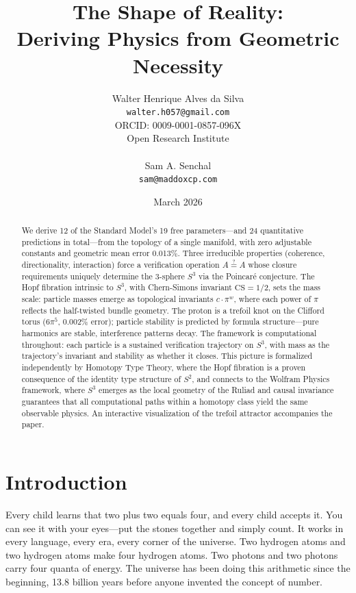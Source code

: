 \documentclass[12pt]{article}
\title{The Shape of Reality: \\
Deriving Physics from Geometric Necessity}
\author{
    Walter Henrique Alves da Silva \\
    \texttt{walter.h057@gmail.com} \\
    ORCID: 0009-0001-0857-096X \\
    Open Research Institute \\
    \\
    Sam A. Senchal \\
    \texttt{sam@maddoxcp.com} \\
}
\date{March 2026}
\begin{document}
\maketitle

\begin{abstract}
We derive 12 of the Standard Model's 19 free parameters---and 24 quantitative predictions in total---from the topology of a single manifold, with zero adjustable constants and geometric mean error 0.013\%. Three irreducible properties (coherence, directionality, interaction) force a verification operation $A \stackrel{?}{=} A$ whose closure requirements uniquely determine the 3-sphere $S^3$ via the Poincar\'e conjecture. The Hopf fibration intrinsic to $S^3$, with Chern-Simons invariant $\mathrm{CS} = 1/2$, sets the mass scale: particle masses emerge as topological invariants $c \cdot \pi^w$, where each power of $\pi$ reflects the half-twisted bundle geometry. The proton is a trefoil knot on the Clifford torus ($6\pi^5$, 0.002\% error); particle stability is predicted by formula structure---pure harmonics are stable, interference patterns decay. The framework is computational throughout: each particle is a sustained verification trajectory on $S^3$, with mass as the trajectory's invariant and stability as whether it closes. This picture is formalized independently by Homotopy Type Theory, where the Hopf fibration is a proven consequence of the identity type structure of $S^2$, and connects to the Wolfram Physics framework, where $S^3$ emerges as the local geometry of the Ruliad and causal invariance guarantees that all computational paths within a homotopy class yield the same observable physics. An interactive visualization of the trefoil attractor accompanies the paper.
\end{abstract}

\tableofcontents
\newpage

\section{Introduction}

Every child learns that two plus two equals four, and every child accepts it. You can see it with your eyes---put the stones together and simply count. It works in every language, every era, every corner of the universe. Two hydrogen atoms and two hydrogen atoms make four hydrogen atoms. Two photons and two photons carry four quanta of energy. The universe has been doing this arithmetic since the beginning, 13.8 billion years before anyone invented the concept of number.
\end{document}
